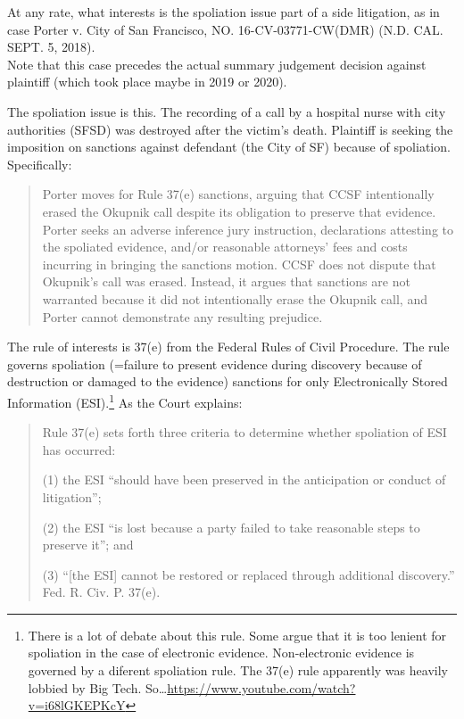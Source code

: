 \documentclass[
  10pt,
  dvipsnames,enabledeprecatedfontcommands]{scrartcl}
\begin{document}
At any rate, what interests is the spoliation issue part of a side
litigation, as in case Porter v. City of San Francisco, NO.
16-CV-03771-CW(DMR) (N.D. CAL. SEPT. 5, 2018).\\
Note that this case precedes the actual summary judgement decision
against plaintiff (which took place maybe in 2019 or 2020).

The spoliation issue is this. The recording of a call by a hospital
nurse with city authorities (SFSD) was destroyed after the victim's
death. Plaintiff is seeking the imposition on sanctions against
defendant (the City of SF) because of spoliation. Specifically:

\begin{quote}
Porter moves for Rule 37(e) sanctions, arguing that CCSF intentionally erased the Okupnik
call despite its obligation to preserve that evidence. Porter seeks an adverse inference jury
instruction, declarations attesting to the spoliated evidence, and/or reasonable attorneys’ fees and
costs incurring in bringing the sanctions motion. CCSF does not dispute that Okupnik’s call was
erased. Instead, it argues that sanctions are not warranted because it did not intentionally erase the
Okupnik call, and Porter cannot demonstrate any resulting prejudice.
\end{quote}

The rule of interests is 37(e) from the Federal Rules of Civil
Procedure. The rule governs spoliation (=failure to present evidence
during discovery because of destruction or damaged to the evidence)
sanctions for only Electronically Stored Information (ESI).\footnote{There
  is a lot of debate about this rule. Some argue that it is too lenient
  for spoliation in the case of electronic evidence. Non-electronic
  evidence is governed by a diferent spoliation rule. The 37(e) rule
  apparently was heavily lobbied by Big Tech.
  So\ldots{}\url{https://www.youtube.com/watch?v=i68lGKEPKcY}} As the
Court explains:

\begin{quote}
Rule 37(e) sets forth three criteria to determine whether
spoliation of ESI has occurred: 

(1) the ESI “should have been preserved in the anticipation or
conduct of litigation”; 

(2) the ESI “is lost because a party failed to take reasonable steps to
preserve it”; and 

(3) “[the ESI] cannot be restored or replaced through additional discovery.” Fed.
R. Civ. P. 37(e).
\end{quote}
\end{document}
